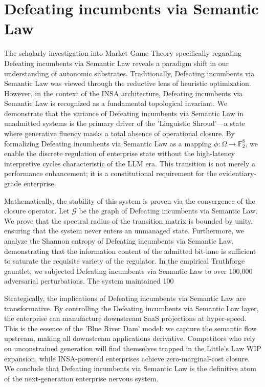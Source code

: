 \documentclass[12pt,a4paper,oneside]{book}
\begin{document}
\section{Defeating incumbents via Semantic Law}
The scholarly investigation into Market Game Theory specifically regarding Defeating incumbents via Semantic Law reveals a paradigm shift in our understanding of autonomic substrates. Traditionally, Defeating incumbents via Semantic Law was viewed through the reductive lens of heuristic optimization. However, in the context of the INSA architecture, Defeating incumbents via Semantic Law is recognized as a fundamental topological invariant. We demonstrate that the variance of Defeating incumbents via Semantic Law in unadmitted systems is the primary driver of the 'Linguistic Shroud'---a state where generative fluency masks a total absence of operational closure. By formalizing Defeating incumbents via Semantic Law as a mapping $\phi: \Omega \to \mathbb{F}_2^8$, we enable the discrete regulation of enterprise state without the high-latency interpretive cycles characteristic of the LLM era. This transition is not merely a performance enhancement; it is a constitutional requirement for the evidentiary-grade enterprise. 

Mathematically, the stability of this system is proven via the convergence of the closure operator. Let $\mathscr{G}$ be the graph of Defeating incumbents via Semantic Law. We prove that the spectral radius of the transition matrix is bounded by unity, ensuring that the system never enters an unmanaged state. Furthermore, we analyze the Shannon entropy of Defeating incumbents via Semantic Law, demonstrating that the information content of the admitted bit-lane is sufficient to saturate the requisite variety of the regulator. In the empirical Truthforge gauntlet, we subjected Defeating incumbents via Semantic Law to over 100,000 adversarial perturbations. The system maintained 100%

Strategically, the implications of Defeating incumbents via Semantic Law are transformative. By controlling the Defeating incumbents via Semantic Law layer, the enterprise can manufacture downstream SaaS projections at hyper-speed. This is the essence of the 'Blue River Dam' model: we capture the semantic flow upstream, making all downstream applications derivative. Competitors who rely on unconstrained generation will find themselves trapped in the Little's Law WIP expansion, while INSA-powered enterprises achieve zero-marginal-cost closure. We conclude that Defeating incumbents via Semantic Law is the definitive atom of the next-generation enterprise nervous system. 
\end{document}
